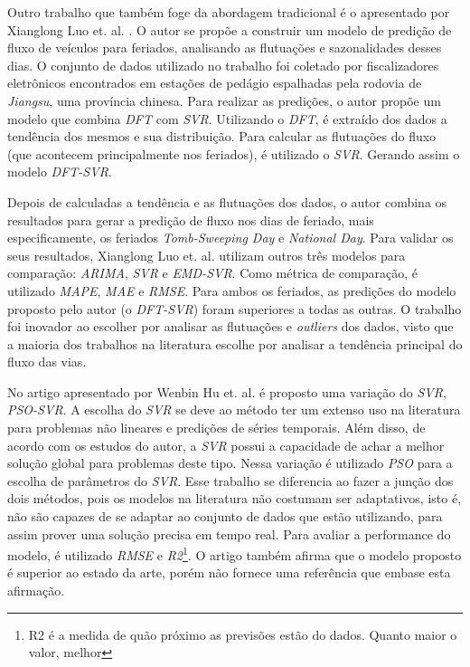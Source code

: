 Outro trabalho que também foge da abordagem tradicional é o apresentado por Xianglong Luo et. al. \cite{luo2019traffic}. O autor se propõe a construir um modelo de predição de fluxo de veículos para feriados, analisando as flutuações e sazonalidades desses dias. O conjunto de dados utilizado no trabalho foi coletado por fiscalizadores eletrônicos encontrados em estações de pedágio espalhadas pela rodovia de \textit{Jiangsu}, uma província chinesa. Para realizar as predições, o autor propõe um modelo que combina \textit{\acrfull{DFT}} com \textit{\acrshort{SVR}}. Utilizando o \textit{\acrshort{DFT}}, é extraído dos dados a tendência dos mesmos e sua distribuição. Para calcular as flutuações do fluxo (que acontecem principalmente nos feriados), é utilizado o \textit{\acrshort{SVR}}. Gerando assim o modelo \textit{\acrfull{DFT-SVR}}.

Depois de calculadas a tendência e as flutuações dos dados, o autor combina os resultados para gerar a predição de fluxo nos dias de feriado, mais especificamente, os feriados \textit{Tomb-Sweeping Day} e \textit{National Day}. Para validar os seus resultados, Xianglong Luo et. al. utilizam outros três modelos para comparação: \textit{\acrshort{ARIMA}}, \textit{\acrshort{SVR}} e \textit{\acrfull{EMD-SVR}}. Como métrica de comparação, é utilizado \textit{\acrshort{MAPE}}, \textit{\acrshort{MAE}} e \textit{\acrshort{RMSE}}.  Para ambos os feriados, as predições do modelo proposto pelo autor (o \textit{\acrshort{DFT-SVR}}) foram superiores a todas as outras. O trabalho foi inovador ao escolher por analisar as flutuações e \textit{outliers} dos dados, visto que a maioria dos trabalhos na literatura escolhe por analisar a tendência principal do fluxo das vias.

No artigo \cite{Hu2016} apresentado por Wenbin Hu et. al. é proposto uma variação do \textit{\acrshort{SVR}}, \textit{\acrfull{PSO-SVR}}. A escolha do \textit{\acrshort{SVR}} se deve ao método ter um extenso uso na literatura para problemas não lineares e predições de séries temporais. Além disso, de acordo com os estudos do autor, a \textit{\acrshort{SVR}} possui a capacidade de achar a melhor solução global para problemas deste tipo. Nessa variação é utilizado \textit{\acrfull{PSO}} para a escolha de parâmetros do \textit{\acrshort{SVR}}. Esse trabalho se diferencia ao fazer a junção dos dois métodos, pois os modelos na literatura não costumam ser adaptativos, isto é, não são capazes de se adaptar ao conjunto de dados que estão utilizando, para assim prover uma solução precisa em tempo real. Para avaliar a performance do modelo, é utilizado \textit{\acrshort{RMSE}} e \textit{\acrfull{R2}}\footnote{R2 é a medida de quão próximo as previsões estão do dados. Quanto maior o valor, melhor}. O artigo também afirma que o modelo proposto é superior ao estado da arte, porém não fornece uma referência que embase esta afirmação.

